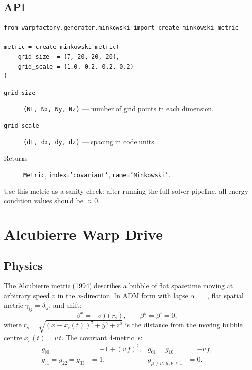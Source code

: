 \documentclass[11pt, a4paper, twoside]{report}
\begin{document}
\subsection{API}

\begin{lstlisting}[caption={Minkowski metric}]
from warpfactory.generator.minkowski import create_minkowski_metric

metric = create_minkowski_metric(
    grid_size  = (7, 20, 20, 20),
    grid_scale = (1.0, 0.2, 0.2, 0.2)
)
\end{lstlisting}

\begin{description}
  \item[\texttt{grid\_size}] \texttt{(Nt, Nx, Ny, Nz)} — number of
        grid points in each dimension.
  \item[\texttt{grid\_scale}] \texttt{(dt, dx, dy, dz)} — spacing in
        code units.
  \item[Returns] \texttt{Metric}, \texttt{index='covariant'},
        \texttt{name='Minkowski'}.
\end{description}

Use this metric as a sanity check: after running the full solver
pipeline, all energy condition values should be $\approx 0$.

\section{Alcubierre Warp Drive}
\label{sec:alcubierre}

\subsection{Physics}

The Alcubierre metric (1994) describes a bubble of flat spacetime moving
at arbitrary speed $v$ in the $x$-direction.  In ADM form with lapse
$\alpha=1$, flat spatial metric $\gamma_{ij}=\delta_{ij}$, and shift:
\begin{equation}
  \beta^x = -v\,f(r_s),
  \qquad \beta^y = \beta^z = 0,
\end{equation}
where $r_s = \sqrt{(x - x_s(t))^2 + y^2 + z^2}$ is the distance from
the moving bubble centre $x_s(t) = v\,t$.  The covariant 4-metric is:
\begin{align}
  g_{00} &= -1 + (v\,f)^2, &
  g_{01} = g_{10} &= -v\,f, \label{eq:alc_metric} \\
  g_{11} = g_{22} = g_{33} &= 1, &
  g_{\mu\neq\nu, \,\mu,\nu\ge1} &= 0. \nonumber
\end{align}
\end{document}
